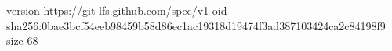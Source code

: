 version https://git-lfs.github.com/spec/v1
oid sha256:0bae3bcf54eeb98459b58d86ec1ac19318d19474f3ad387103424ca2c84198f9
size 68
